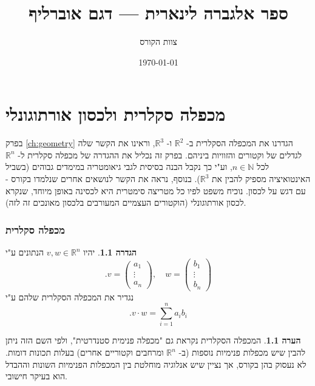 \documentclass[12pt]{report}
\title{ספר אלגברה לינארית — דגם אוברליף}
\author{צוות הקורס}
\date{\today}
\theoremstyle{plain}
\theoremstyle{definition}
\newtheorem{definition}[theorem]{הגדרה}
\newtheorem{remark}{הערה}[chapter]
\newcommand{\R}{\mathbb{R}}
\newcommand{\N}{\mathbb{N}}
\newcommand{\0}{\mathbf{0}}
\begin{document}
\maketitle

\chapter{מכפלה סקלרית ולכסון אורתוגונלי}\label{ch:scalar}

בפרק 
\ref{ch:geometry}
הגדרנו את המכפלה הסקלרית ב-
$\R^2$
ו-
$\R^3$,
וראינו את הקשר שלה לגדלים של וקטורים והזוויות ביניהם. בפרק זה נכליל את ההגדרה של מכפלה סקלרית ל-
$\R^n$
לכל
$n\in\N$,
וע"י כך נקבל הבנה בסיסית לגבי גיאומטריה במימדים גבוהים (בשביל האינטואיציה מספיק להבין את
$\R^3$).
בנוסף, נראה את הקשר לנושאים אחרים שנלמדו בקורס - עם דגש על לכסון. נוכיח משפט לפיו כל מטריצה סימטרית היא לכסינה באופן מיוחד, שנקרא לכסון אורתוגונלי (הוקטורים העצמיים המעורבים בלכסון מאונכים זה לזה).

\subsection{מכפלה סקלרית}

\begin{definition}
\adddeftolist{מכפלה סקלרית ב-$\R^n$}
יהיו 
$v,w\in\R^n$
הנתונים ע"י
$$
.v=\begin{pmatrix}
a_1 \\
\vdots \\
a_n
\end{pmatrix},\quad w=\begin{pmatrix}
b_1 \\
\vdots \\
b_n
\end{pmatrix}
$$
נגדיר את המכפלה הסקלרית שלהם ע"י
$$
.v\cdot w=\sum_{i=1}^n a_ib_i
$$
\end{definition}

\begin{remark}
המכפלה הסקלרית נקראת גם "מכפלה פנימית סטנדרטית", ולפי השם הזה ניתן להבין שיש מכפלות פנימיות נוספות (ב-
$\R^n$
ומרחבים וקטוריים אחרים)
בעלות תכונות דומות. לא נעסוק בהן בקורס, אך נציין שיש אנלוגיה מוחלטת בין המכפלות הפנימיות השונות וההבדל הוא בעיקר חישובי.
\end{remark}
\end{document}
